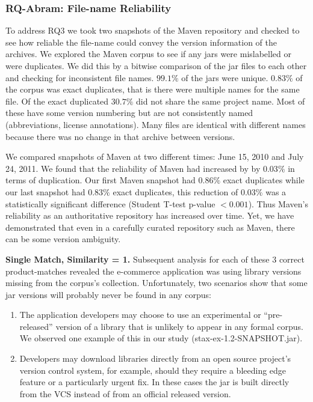 \subsubsection{RQ-Abram: File-name Reliability}
\label{sec:mavenreliability}

To address RQ3 we took two snapshots of the Maven repository and
checked to see how reliable the file-name could convey the version
information of the archives.
We explored the Maven corpus to see if any jars were
mislabelled or were duplicates. We did this by a bitwise comparison of the jar files
to each other and checking for inconsistent file names. $99.1\%$ of
the jars were unique. 
$0.83\%$ of the corpus was exact duplicates, that is there were
multiple names for the same file.
Of the exact duplicated $30.7\%$ did not share the
same project name. 
Most of these have some version
numbering but are not consistently named (abbreviations, license
annotations). Many files are identical with different names because
there was no change in that archive between versions. 

We compared snapshots of Maven at two different times: June 15, 2010
and July 24, 2011. We found that the reliability of Maven had
increased by by $0.03\%$ in terms of duplication.
Our first Maven snapshot had $0.86\%$ exact duplicates while our last
snapshot had $0.83\%$ exact duplicates, this reduction of $0.03\%$ was
a statistically significant difference (Student T-test p-value $< 0.001$).
Thus Maven's reliability as an authoritative repository has
increased over time. Yet, we have demonstrated that even in a carefully curated
repository such as Maven, there can be some version ambiguity.





\textbf{Single Match, Similarity = 1.}
Subsequent analysis for each of these $3$ correct product-matches revealed the e-commerce
application was using
library versions missing from the corpus's collection.
Unfortunately, two scenarios show that some jar versions will probably
never be found in any corpus:

\begin{enumerate}

\item The application developers
may choose to use an experimental or ``pre-released'' version of
a library that is unlikely to appear in any formal corpus.
We observed one example of this in our study (stax-ex-1.2-SNAPSHOT.jar).

\item Developers may download libraries directly from an open source project's version
control system, for example, should they require a bleeding edge feature or a particularly
urgent fix.  In these cases the jar is built directly from the VCS
instead of from an official released version.

\end{enumerate}

